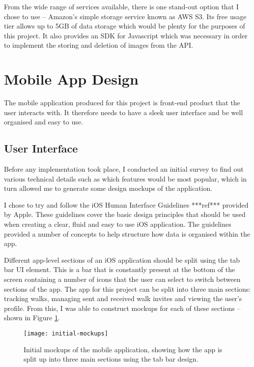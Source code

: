 From the wide range of services available, there is one stand-out option that I chose to use -- Amazon's simple storage service known as AWS S3. Its free usage tier allows up to 5GB of data storage which would be plenty for the purposes of this project. It also provides an SDK for Javascript which was necessary in order to implement the storing and deletion of images from the API.

\section{Mobile App Design}


The mobile application produced for this project is front-end product that the user interacts with. It therefore needs to have a sleek user interface and be well organised and easy to use.

\subsection{User Interface}

Before any implementation took place, I conducted an initial survey to find out various technical details such as which features would be most popular, which in turn allowed me to generate some design mockups of the application.

I chose to try and follow the iOS Human Interface Guidelines ***ref*** provided by Apple. These guidelines cover the basic design principles that should be used when creating a clear, fluid and easy to use iOS application. The guidelines provided a number of concepts to help structure how data is organised within the app.

Different app-level sections of an iOS application should be split using the tab bar UI element. This is a bar that is constantly present at the bottom of the screen containing a number of icons that the user can select to switch between sections of the app. The app for this project can be split into three main sections: tracking walks, managing sent and received walk invites and viewing the user's profile. From this, I was able to construct mockups for each of these sections -- shown in Figure \ref{fig:initial-mockups}.

\begin{figure}[hbt]
  \centering
  \texttt{[image: initial-mockups]}
  \caption{Initial mockups of the mobile application, showing how the app is split up into three main sections using the tab bar design.}
  \label{fig:initial-mockups}
\end{figure}

